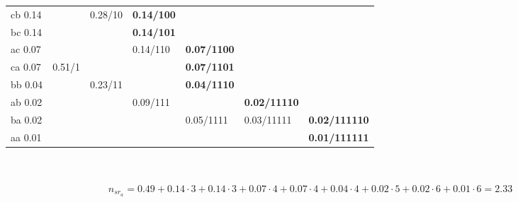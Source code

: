 \documentclass[12pt]{article}
\begin{document}
\begin{enumerate}
\begin{tabular}{|l|l|lllll}
cb 0.14 &                 & \multicolumn{1}{l|}{0.28/10} & \multicolumn{1}{l|}{\textbf{0.14/100}} &                                         &                                          &                                           \\ \cline{1-1} \cline{4-4}
bc 0.14 &                 & \multicolumn{1}{l|}{}        & \multicolumn{1}{l|}{\textbf{0.14/101}} &                                         &                                          &                                           \\ \cline{1-1} \cline{3-5}
ac 0.07 &                 & \multicolumn{1}{l|}{}        & \multicolumn{1}{l|}{0.14/110}          & \multicolumn{1}{l|}{\textbf{0.07/1100}} &                                          &                                           \\ \cline{1-1} \cline{5-5}
ca 0.07 & 0.51/1          & \multicolumn{1}{l|}{}        & \multicolumn{1}{l|}{}                  & \multicolumn{1}{l|}{\textbf{0.07/1101}} &                                          &                                           \\ \cline{1-1} \cline{4-5}
bb 0.04 &                 & \multicolumn{1}{l|}{0.23/11} & \multicolumn{1}{l|}{}                  & \multicolumn{1}{l|}{\textbf{0.04/1110}} &                                          &                                           \\ \cline{1-1} \cline{5-6}
ab 0.02 &                 & \multicolumn{1}{l|}{}        & \multicolumn{1}{l|}{0.09/111}          & \multicolumn{1}{l|}{}                   & \multicolumn{1}{l|}{\textbf{0.02/11110}} &                                           \\ \cline{1-1} \cline{6-7} 
ba 0.02 &                 & \multicolumn{1}{l|}{}        & \multicolumn{1}{l|}{}                  & \multicolumn{1}{l|}{0.05/1111}          & \multicolumn{1}{l|}{0.03/11111}          & \multicolumn{1}{l|}{\textbf{0.02/111110}} \\ \cline{1-1} \cline{7-7} 
aa 0.01 &                 & \multicolumn{1}{l|}{}        & \multicolumn{1}{l|}{}                  & \multicolumn{1}{l|}{}                   & \multicolumn{1}{l|}{}                    & \multicolumn{1}{l|}{\textbf{0.01/111111}} \\ \hline
\end{tabular}	
\\
\\
\begin{equation*}
    n_{sr_{a}} = 0.49 + 0.14 \cdot 3 + 0.14 \cdot 3 + 0.07 \cdot 4 + 0.07 \cdot 4 + 0.04 \cdot 4 + 0.02 \cdot 5 + 0.02 \cdot 6 + 0.01 \cdot 6 = 2.33

\end{equation*}
\end{enumerate}
\end{document}
